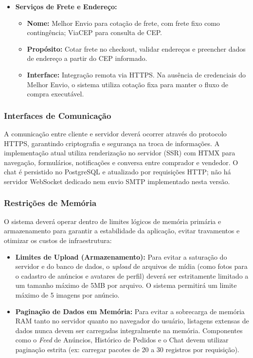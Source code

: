 \documentclass[
	article,			%
	11pt,				%
	oneside,			%
	a4paper,			%
	english,			%
	brazil,				%
	sumario=tradicional
	]{abntex2}
\begin{document}
\begin{itemize}
    \vspace{0.5em}

    \item \textbf{Serviços de Frete e Endereço:}
    \begin{itemize}
        \item[ ] \textbf{Nome:} Melhor Envio para cotação de frete, com frete fixo como contingência; ViaCEP para consulta de CEP.
        \item[ ] \textbf{Propósito:} Cotar frete no checkout, validar endereços e preencher dados de endereço a partir do CEP informado.
        \item[ ] \textbf{Interface:} Integração remota via HTTPS. Na ausência de credenciais do Melhor Envio, o sistema utiliza cotação fixa para manter o fluxo de compra executável.
    \end{itemize}
\end{itemize}

\subsubsection{Interfaces de Comunicação}
\label{sec:InterfaceComunicacao}

A comunicação entre cliente e servidor deverá ocorrer através do protocolo HTTPS, garantindo criptografia e segurança na troca de informações. A implementação atual utiliza renderização no servidor (SSR) com HTMX para navegação, formulários, notificações e conversa entre comprador e vendedor. O chat é persistido no PostgreSQL e atualizado por requisições HTTP; não há servidor WebSocket dedicado nem envio SMTP implementado nesta versão.

\subsubsection{Restrições de Memória}
\label{sec:RestricoesMemoria}

O sistema deverá operar dentro de limites lógicos de memória primária e armazenamento para garantir a estabilidade da aplicação, evitar travamentos e otimizar os custos de infraestrutura:

\begin{itemize}
    \item \textbf{Limites de Upload (Armazenamento):} Para evitar a saturação do servidor e do banco de dados, o \textit{upload} de arquivos de mídia (como fotos para o cadastro de anúncios e avatares de perfil) deverá ser estritamente limitado a um tamanho máximo de 5MB por arquivo. O sistema permitirá um limite máximo de 5 imagens por anúncio.
    
    
    \item \textbf{Paginação de Dados em Memória:} Para evitar a sobrecarga de memória RAM tanto no servidor quanto no navegador do usuário, listagens extensas de dados nunca devem ser carregadas integralmente na memória. Componentes como o \textit{Feed} de Anúncios, Histórico de Pedidos e o Chat devem utilizar paginação estrita (ex: carregar pacotes de 20 a 30 registros por requisição).
\end{itemize}
\end{document}
